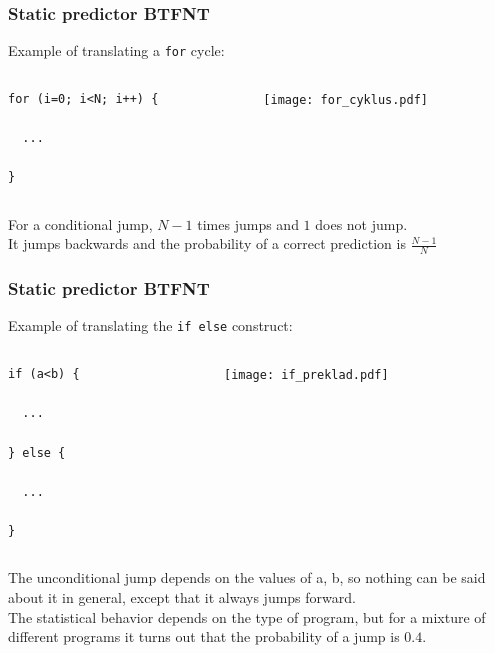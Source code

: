 \documentclass{beamer}
\begin{document}
\begin{frame}[fragile]
\frametitle{Static predictor BTFNT}

Example of translating a \texttt{for} cycle:

\begin{columns}[T]
\begin{column}{0.4\textwidth}
\begin{verbatim}
for (i=0; i<N; i++) {

  ...
  
}
\end{verbatim}
\end{column}
\begin{column}{0.6\textwidth}
\texttt{[image: for\_cyklus.pdf]}
\end{column}
\end{columns}
\bigskip
For a conditional jump, $N-1$ times jumps and $1$ does not jump.\\
It jumps backwards and the probability of a correct prediction is $\frac{N-1}{N}$

\end{frame}

\begin{frame}[fragile]
\frametitle{Static predictor BTFNT}

Example of translating the \texttt{if else} construct:

\begin{columns}[T]
\begin{column}{0.4\textwidth}
\begin{verbatim}
if (a<b) {
  
  ...

} else {

  ...

}
\end{verbatim}
\end{column}
\begin{column}{0.6\textwidth}
\texttt{[image: if\_preklad.pdf]}
\end{column}
\end{columns}
\bigskip
The unconditional jump depends on the values of a, b, so nothing can be said about it in general, except that it always jumps forward.\\
The statistical behavior depends on the type of program, but for a mixture of different programs it turns out that the probability of a jump is $0.4$.

\end{frame}
\end{document}
